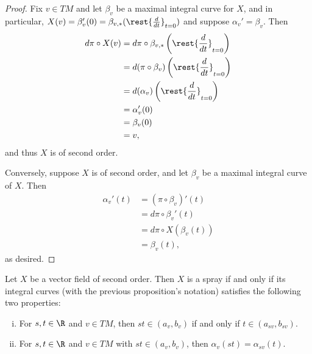 \begin{proof}
Fix $v\in TM$ and let $\beta_v$ be a maximal integral curve for $X$, and in particular, $X(v)=\beta_v'(0)=\beta_{v,*}(\rest{\frac{d}{dt}}_{t=0})$ and suppose $\alpha_v'=\beta_v$.  Then
\begin{align*}
	d\pi\circ X(v)&=d\pi\circ\beta_{v,*}\left(\rest{\frac{d}{dt}}_{t=0}\right)\\
	&=d(\pi\circ\beta_v)\left(\rest{\frac{d}{dt}}_{t=0}\right)\\
	&=d(\alpha_v)\left(\rest{\frac{d}{dt}}_{t=0}\right)\\
	&=\alpha_v'(0)\\
	&=\beta_v(0)\\
	&=v,
\end{align*}
and thus $X$ is of second order.

Conversely, suppose $X$ is of second order, and let $\beta_v$ be a maximal integral curve of $X$.  Then
\begin{align*}
	\alpha_v'(t)&=(\pi\circ\beta_v)'(t)\\
	&=d\pi\circ\beta_v'(t)\\
	&=d\pi\circ X(\beta_v(t))\\
	&=\beta_v(t),
\end{align*}
as desired.
\end{proof}

\begin{prop}
    Let $X$ be a vector field of second order.  Then $X$ is a spray if and only if its integral curves (with the previous proposition's notation) satisfies the following two properties:
    \begin{enumerate}[i.]
    \item For $s,t\in\R$ and $v\in TM$, then $st\in(a_v,b_v)$ if and only if $t\in(a_{sv},b_{sv})$.
    \item For $s,t\in\R$ and $v\in TM$ with $st\in(a_v,b_v)$, then $\alpha_v(st)=\alpha_{sv}(t)$.
    \end{enumerate}
\end{prop}

